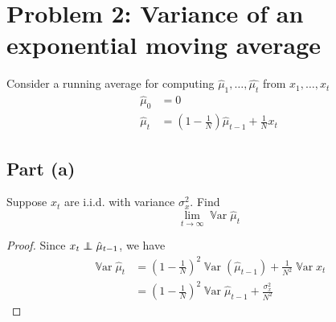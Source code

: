 \documentclass{amsart}
\newcommand\ind{\protect\mathpalette{\protect\independenT}{\perp}}
\def\independenT#1#2{\mathrel{\rlap{$#1#2$}\mkern2mu{#1#2}}}
\DeclareMathOperator{\Var}{\mathbb{V}ar}  %
\theoremstyle{definition}
\begin{document}
\section*{Problem 2: Variance of an exponential moving average}
Consider a running average for computing $\hat{\mu}_1, \ldots, \hat{\mu_t}$ from $x_1, \ldots, x_t$
\begin{align*}
    \hat{\mu}_0 &= 0\\
    \hat{\mu}_t &= \left(
    1 - \frac1{N} 
    \right) \hat{\mu}_{t - 1} + \frac1{N} x_t
\end{align*}
\subsection*{Part (a)} Suppose $x_t$ are i.i.d. with variance $\sigma_x^2$. 
Find 
\[
\lim_{t\to\infty} \Var{\hat{\mu}_t}
\]
\begin{proof}
    Since $x_t \ind \hat{\mu}_{t - 1}$, we have
    \begin{align*}
        \Var{\hat{\mu}_t} &= \left(
            1 - \frac1{N}
        \right)^2\Var{ (\hat{\mu}_{t - 1})} + \frac1{N^2} \Var{x_t} \\
        &= \left(1 - \frac1{N}\right)^2 \Var{\hat{\mu}_{t - 1}} + \frac{\sigma_x^2}{N^2}
    \end{align*}
\end{proof}
\end{document}
